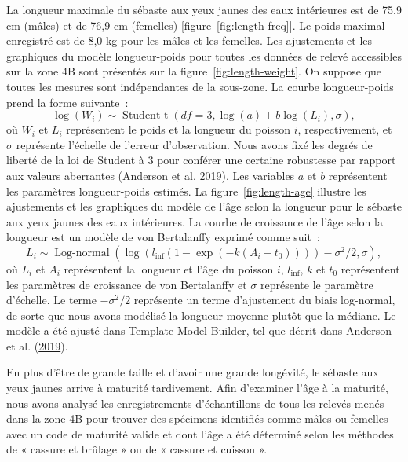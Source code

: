 \documentclass[french,11pt]{book}
\begin{document}
La longueur maximale du sébaste aux yeux jaunes des eaux intérieures est de 75,9 cm (mâles) et de 76,9 cm (femelles) {[}figure~\ref{fig:length-freq}{]}. Le poids maximal enregistré est de 8,0 kg pour les mâles et les femelles. Les ajustements et les graphiques du modèle longueur-poids pour toutes les données de relevé accessibles sur la zone 4B sont présentés sur la figure~\ref{fig:length-weight}. On suppose que toutes les mesures sont indépendantes de la sous-zone. La courbe longueur-poids prend la forme suivante~:
\begin{equation}
\log (W_i) \sim \operatorname{Student-t}(df = 3, \log(a) + b \log(L_i), \sigma),
\end{equation}
où \(W_i\) et \(L_i\) représentent le poids et la longueur du poisson \(i\), respectivement, et \(\sigma\) représente l'échelle de l'erreur d'observation. Nous avons fixé les degrés de liberté de la loi de Student à 3 pour conférer une certaine robustesse par rapport aux valeurs aberrantes (\protect\hyperlink{ref-anderson2019synopsis}{Anderson et al. 2019}). Les variables \(a\) et \(b\) représentent les paramètres longueur-poids estimés. La figure~\ref{fig:length-age} illustre les ajustements et les graphiques du modèle de l'âge selon la longueur pour le sébaste aux yeux jaunes des eaux intérieures. La courbe de croissance de l'âge selon la longueur est un modèle de von Bertalanffy exprimé comme suit~:
\begin{equation}
L_i \sim \operatorname{Log-normal}
\left( \log(l_\mathrm{inf} (1 - \exp(-k (A_i - t_0)))) -
\sigma^2 / 2, \sigma \right),
\end{equation}
où \(L_i\) et \(A_i\) représentent la longueur et l'âge du poisson \(i\), \(l_\mathrm{inf}\), \(k\) et \(t_0\) représentent les paramètres de croissance de von Bertalanffy et \(\sigma\) représente le paramètre d'échelle. Le terme \(- \sigma^2 /2\) représente un terme d'ajustement du biais log-normal, de sorte que nous avons modélisé la longueur moyenne plutôt que la médiane. Le modèle a été ajusté dans Template Model Builder, tel que décrit dans Anderson et al. (\protect\hyperlink{ref-anderson2019synopsis}{2019}).

\hypertarget{sec:maturity}{%
\label{sec:maturity}}

En plus d'être de grande taille et d'avoir une grande longévité, le sébaste aux yeux jaunes arrive à maturité tardivement. Afin d'examiner l'âge à la maturité, nous avons analysé les enregistrements d'échantillons de tous les relevés menés dans la zone 4B pour trouver des spécimens identifiés comme mâles ou femelles avec un code de maturité valide et dont l'âge a été déterminé selon les méthodes de « cassure et brûlage » ou de « cassure et cuisson ».
\end{document}
